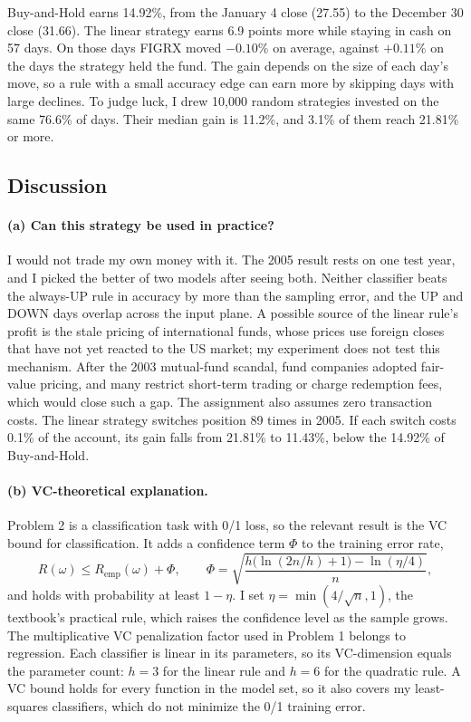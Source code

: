 Buy-and-Hold earns 14.92\%, from the January 4 close (27.55) to the December 30 close (31.66). The linear strategy
earns 6.9 points more while staying in cash on 57 days. On those days FIGRX moved $-0.10\%$ on average, against
$+0.11\%$ on the days the strategy held the fund. The gain depends on the size of each day's move, so a rule with a
small accuracy edge can earn more by skipping days with large declines. To judge luck, I drew 10{,}000 random strategies invested on the same 76.6\% of days. Their
median gain is 11.2\%, and 3.1\% of them reach 21.81\% or more.

\subsection*{Discussion}
\paragraph{(a) Can this strategy be used in practice?}
I would not trade my own money with it. The 2005 result rests on one test year, and I picked the better of two
models after seeing both. Neither classifier beats the always-UP rule in accuracy by more than the sampling error,
and the UP and DOWN days overlap across the input plane. A possible source of the linear rule's profit is the stale
pricing of international funds, whose prices use foreign closes that have not yet reacted to the US market; my
experiment does not test this mechanism. After the 2003 mutual-fund scandal, fund companies adopted fair-value
pricing, and many restrict short-term trading or charge redemption fees, which would close such a gap. The assignment
also assumes zero transaction costs. The linear strategy switches position 89 times in 2005. If each switch costs
0.1\% of the account, its gain falls from 21.81\% to 11.43\%, below the 14.92\% of Buy-and-Hold.

\paragraph{(b) VC-theoretical explanation.}
Problem 2 is a classification task with 0/1 loss, so the relevant result is the VC bound for classification. It
adds a confidence term $\Phi$ to the training error rate,
\[
  R(\omega) \le R_{\text{emp}}(\omega) + \Phi, \qquad
  \Phi = \sqrt{\frac{h\bigl(\ln(2n/h) + 1\bigr) - \ln(\eta/4)}{n}},
\]
and holds with probability at least $1 - \eta$. I set $\eta = \min(4/\sqrt{n}, 1)$, the textbook's practical rule,
which raises the confidence level as the sample grows. The multiplicative VC penalization factor used in Problem 1
belongs to regression. Each classifier is linear in its parameters, so its VC-dimension equals the parameter count:
$h = 3$ for the linear rule and $h = 6$ for the quadratic rule. A VC bound holds for every function in the model
set, so it also covers my least-squares classifiers, which do not minimize the 0/1 training error.

